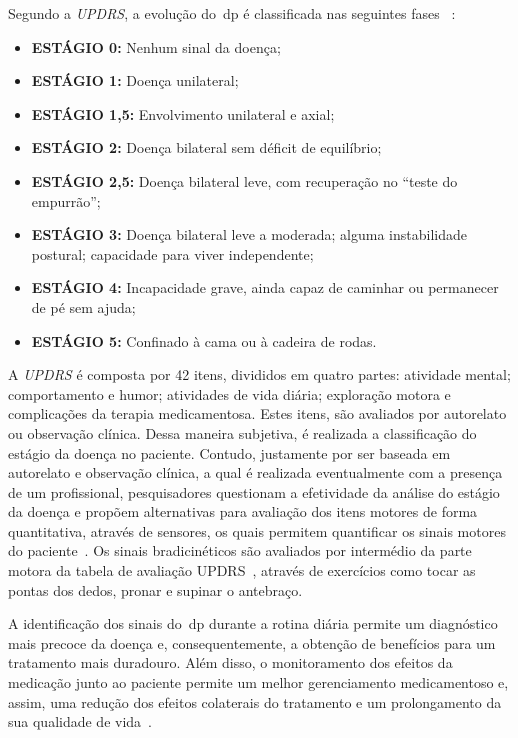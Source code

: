Segundo a \textit{UPDRS}, a evolução do~\ac{dp} é classificada nas seguintes fases ~\cite{updrs87}:
  \begin{itemize}
    \item \textbf{ESTÁGIO 0:} Nenhum sinal da doença;
    \item \textbf{ESTÁGIO 1:} Doença unilateral;
    \item \textbf{ESTÁGIO 1,5:} Envolvimento unilateral e axial;
    \item \textbf{ESTÁGIO 2:} Doença bilateral sem déficit de equilíbrio;
    \item \textbf{ESTÁGIO 2,5:} Doença bilateral leve, com recuperação no “teste do empurrão”;
    \item \textbf{ESTÁGIO 3:} Doença bilateral leve a moderada; alguma instabilidade postural; capacidade para viver independente;
    \item \textbf{ESTÁGIO 4:} Incapacidade grave, ainda capaz de caminhar ou permanecer de pé sem ajuda;
    \item \textbf{ESTÁGIO 5:} Confinado à cama ou à cadeira de rodas.
  \end{itemize}

A \textit{UPDRS} é composta por 42 itens, divididos em quatro partes: atividade mental; comportamento e humor; atividades de vida diária; exploração motora e complicações da terapia medicamentosa. Estes itens, são avaliados por autorelato ou observação clínica. Dessa maneira subjetiva, é realizada a classificação do estágio da doença no paciente. Contudo, justamente por ser baseada em autorelato e observação clínica, a qual é realizada eventualmente com a presença de um profissional, pesquisadores questionam a efetividade da análise do estágio da doença e propõem alternativas para avaliação dos itens motores de forma quantitativa, através de sensores, os quais permitem quantificar os sinais motores do paciente~\cite{kostek12,synnott_wiipd_2012,patel_monitoring_2009}. Os sinais bradicinéticos são avaliados por intermédio da parte motora da tabela de avaliação UPDRS~\cite{updrs87}, através de exercícios como tocar as pontas dos dedos, pronar e supinar o antebraço.

A identificação dos sinais do~\ac{dp} durante a rotina diária permite um diagnóstico mais precoce da doença e, consequentemente, a obtenção de benefícios para um tratamento mais duradouro. Além disso, o monitoramento dos efeitos da medicação junto ao paciente permite um melhor gerenciamento medicamentoso e, assim, uma redução dos efeitos colaterais do tratamento e um prolongamento da sua qualidade de vida~\cite{rowlandtratado}.


